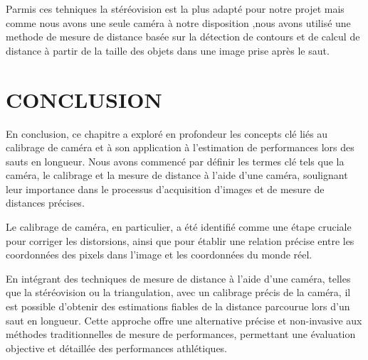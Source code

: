 Parmis ces tehniques la stéréovision est la plus adapté pour notre projet mais comme nous avons une seule caméra à notre disposition ,nous avons utilisé une methode de mesure de distance basée sur la détection de contours et de calcul de distance à partir de la taille des objets dans une image prise après le saut.

\section{CONCLUSION}

En conclusion, ce chapitre a exploré en profondeur les concepts clé liés au calibrage de caméra et à son application à l'estimation de performances lors des sauts en longueur. Nous avons commencé par définir les termes clé tels que la caméra, le calibrage et la mesure de distance à l'aide d'une caméra, soulignant leur importance dans le processus d'acquisition d'images et de mesure de distances précises.

Le calibrage de caméra, en particulier, a été identifié comme une étape cruciale pour corriger les distorsions, ainsi que pour établir une relation précise entre les coordonnées des pixels dans l'image et les coordonnées du monde réel.  

En intégrant des techniques de mesure de distance à l'aide d'une caméra, telles que la stéréovision ou la triangulation, avec un calibrage précis de la caméra, il est possible d'obtenir des estimations fiables de la distance parcourue lors d'un saut en longueur. Cette approche offre une alternative précise et non-invasive aux méthodes traditionnelles de mesure de performances, permettant une évaluation objective et détaillée des performances athlétiques.
 